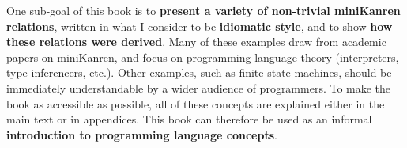One sub-goal of this book is to {\bf present a variety of non-trivial
  miniKanren relations}, written in what I consider to be {\bf
  idiomatic style}, and to show {\bf how these relations were
  derived}.
%
Many of these examples draw from academic papers on miniKanren, and
focus on programming language theory (interpreters, type inferencers,
etc.).
%
Other examples, such as finite state machines, should be immediately
understandable by a wider audience of programmers.
%
To make the book as accessible as possible, all of these concepts are
explained either in the main text or in appendices.
%
This book can therefore be used as an informal {\bf introduction to
  programming language concepts}.





